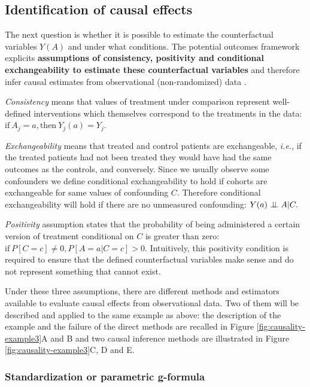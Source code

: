 \documentclass[a4paper,12pt,twoside,onecolumn,openright,final,oldfontcommands]{memoir}
\begin{document}
\subsection{Identification of causal
effects}\label{causal-identification-simple}

The next question is whether it is possible to estimate the
counterfactual variables \(Y(A)\) and under what conditions. The
potential outcomes framework explicits \textbf{assumptions of
consistency, positivity and conditional exchangeability to estimate
these counterfactual variables} and therefore infer causal estimates
from observational (non-randomized) data
\citep[\citet{hernan2020causal}]{rubin1974estimating}.

\emph{Consistency} means that values of treatment under comparison
represent well-defined interventions which themselves correspond to the
treatments in the data:
\(\textrm{if} \: A_j=a, \textrm{then} \: Y_j(a)=Y_j.\)

\emph{Exchangeability} means that treated and control patients are
exchangeable, \emph{i.e.}, if the treated patients had not been treated
they would have had the same outcomes as the controls, and conversely.
Since we usually observe some confounders we define conditional
exchangeability to hold if cohorts are exchangeable for same values of
confounding \(C\). Therefore conditional exchangeability will hold if
there are no unmeasured confounding: \(Y(a) \perp \!\!\! \perp A | C.\)

\emph{Positivity} assumption states that the probability of being
administered a certain version of treatment conditional on \(C\) is
greater than zero: \(\textrm{if} \: P[C=c] \neq 0, P[A=a | C=c] >0.\)
Intuitively, this positivity condition is required to ensure that the
defined counterfactual variables make sense and do not represent
something that cannot exist.

Under these three assumptions, there are different methods and
estimators available to evaluate causal effects from observational data.
Two of them will be described and applied to the same example as above:
the description of the example and the failure of the direct methods are
recalled in Figure \ref{fig:causality-example3}A and B and two causal
inference methods are illustrated in Figure
\ref{fig:causality-example3}C, D and E.

\subsubsection{Standardization or parametric
g-formula}\label{std-classic}
\end{document}
